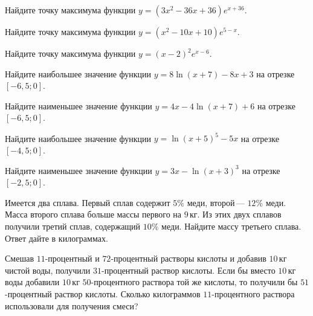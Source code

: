 \begin{class}[number=3]
	\begin{listofex}
		\item Найдите точку максимума функции \( y=(3x^2-36x+36)e^{x+36}. \)
		\item Найдите точку максимума функции \(y=(x^2-10x+10)e^{5-x}\).
		\item Найдите точку максимума функции \(y=(x-2)^2e^{x-6}\).
		\item Найдите наибольшее значение функции \(y=8\ln(x+7)-8x+3\) на отрезке \([-6,5; 0]\).
		\item Найдите наименьшее значение функции \(y=4x-4\ln(x+7)+6\) на отрезке \([-6,5; 0]\).
		\item Найдите наибольшее значение функции \(y=\ln(x+5)^5-5x\) на отрезке \([-4,5; 0]\).
		\item Найдите наименьшее значение функции \(y=3x-\ln(x+3)^3\) на отрезке \([-2,5; 0]\).
		
		
		
		\item Имеется два сплава. Первый сплав содержит \(5\%\) меди, второй --- \(12\%\) меди. Масса второго сплава больше массы первого на \(9\) кг. Из этих двух сплавов получили третий сплав, содержащий \(10\%\) меди. Найдите массу третьего сплава. Ответ дайте в килограммах.
		
		\item Смешав \(11\)-процентный и \(72\)-процентный растворы кислоты и добавив \(10\) кг чистой воды, получили \(31\)-процентный раствор кислоты. Если бы вместо \(10\) кг воды добавили \(10\) кг \(50\)-процентного раствора той же кислоты, то получили бы \(51\)-процентный раствор кислоты. Сколько килограммов \(11\)-процентного раствора использовали для получения смеси?
		
		
		
	\end{listofex}
\end{class}

